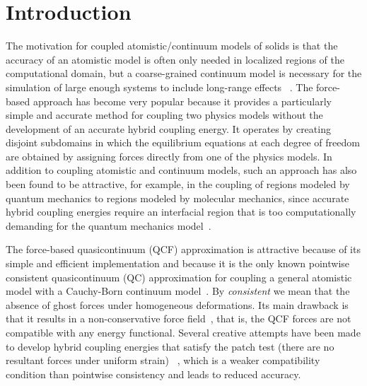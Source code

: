 \documentclass[12pt,reqno]{amsart}
\begin{document}
\maketitle

\vspace{6mm}

\section{Introduction}
{{{The motivation for coupled atomistic/continuum models of solids
  is that the accuracy of an atomistic model is often only needed in
  localized regions of the computational domain, but a coarse-grained
  continuum model is necessary for the simulation of large enough
  systems}}} to include long-range effects ~\cite{LinP:2006a,
  Gunzburger:2008a, arlequin1, blan05, gaviniorbital, Ortner:2008a,
  ted03, Ortiz:1996a,kohlhoff,cadd}.  The force-based approach has
become very popular because {{{it provides a particularly simple
  and accurate \cite{dobs-qcf2} method}}} for coupling two physics
models without the development of an accurate hybrid coupling energy.
It operates by creating disjoint subdomains in which the equilibrium
equations at each degree of freedom are obtained by assigning forces
directly from one of the physics models.  In addition to coupling
atomistic and continuum models, such an approach has also been found
to be attractive, for example, in the coupling of regions modeled by
quantum mechanics to regions modeled by molecular mechanics, since
accurate hybrid coupling energies require an interfacial region that
is too computationally demanding for the quantum mechanics
model~\cite{hybrid_review}.

The force-based quasicontinuum (QCF) approximation is attractive
because of its simple and efficient implementation and because it is
the only known pointwise consistent quasicontinuum (QC) approximation
for coupling a general atomistic model with a Cauchy-Born continuum
model~\cite{dobs-qcf2}. {{{By {\em consistent} we mean that the
  absence of ghost forces under homogeneous deformations.}}} Its main
drawback is that it results in a non-conservative force
field~\cite{Dobson:2008a}, that is, the QCF forces are not compatible
with any energy functional.  Several creative attempts have been made
to develop hybrid coupling energies that satisfy the patch test (there
are no resultant forces under uniform strain)
~\cite{Shimokawa:2004,E:2006}, which is a weaker compatibility
condition than pointwise consistency and leads to reduced accuracy.
\end{document}
